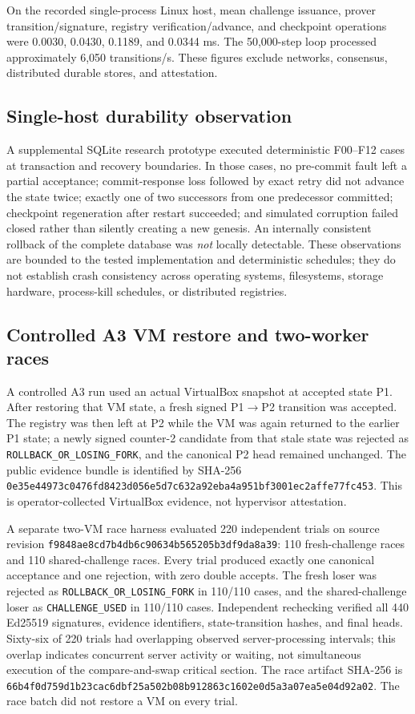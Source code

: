 \documentclass[11pt]{article}
\begin{document}
On the recorded single-process Linux host, mean challenge issuance, prover transition/signature, registry verification/advance, and checkpoint operations were 0.0030, 0.0430, 0.1189, and 0.0344 ms. The 50,000-step loop processed approximately 6,050 transitions/s. These figures exclude networks, consensus, distributed durable stores, and attestation.

\subsection{Single-host durability observation}
A supplemental SQLite research prototype executed deterministic F00--F12 cases at transaction and recovery boundaries. In those cases, no pre-commit fault left a partial acceptance; commit-response loss followed by exact retry did not advance the state twice; exactly one of two successors from one predecessor committed; checkpoint regeneration after restart succeeded; and simulated corruption failed closed rather than silently creating a new genesis. An internally consistent rollback of the complete database was \emph{not} locally detectable. These observations are bounded to the tested implementation and deterministic schedules; they do not establish crash consistency across operating systems, filesystems, storage hardware, process-kill schedules, or distributed registries.

\subsection{Controlled A3 VM restore and two-worker races}
A controlled A3 run used an actual VirtualBox snapshot at accepted state P1. After restoring that VM state, a fresh signed P1$\rightarrow$P2 transition was accepted. The registry was then left at P2 while the VM was again returned to the earlier P1 state; a newly signed counter-2 candidate from that stale state was rejected as \texttt{ROLLBACK\_OR\_LOSING\_FORK}, and the canonical P2 head remained unchanged. The public evidence bundle is identified by SHA-256 \texttt{0e35e44973c0476fd8423d056e5d7c632a92eba4a951bf3001ec2affe77fc453}. This is operator-collected VirtualBox evidence, not hypervisor attestation.

A separate two-VM race harness evaluated 220 independent trials on source revision \texttt{f9848ae8cd7b4db6c90634b565205b3df9da8a39}: 110 fresh-challenge races and 110 shared-challenge races. Every trial produced exactly one canonical acceptance and one rejection, with zero double accepts. The fresh loser was rejected as \texttt{ROLLBACK\_OR\_LOSING\_FORK} in 110/110 cases, and the shared-challenge loser as \texttt{CHALLENGE\_USED} in 110/110 cases. Independent rechecking verified all 440 Ed25519 signatures, evidence identifiers, state-transition hashes, and final heads. Sixty-six of 220 trials had overlapping observed server-processing intervals; this overlap indicates concurrent server activity or waiting, not simultaneous execution of the compare-and-swap critical section. The race artifact SHA-256 is \texttt{66b4f0d759d1b23cac6dbf25a502b08b912863c1602e0d5a3a07ea5e04d92a02}. The race batch did not restore a VM on every trial.
\end{document}
